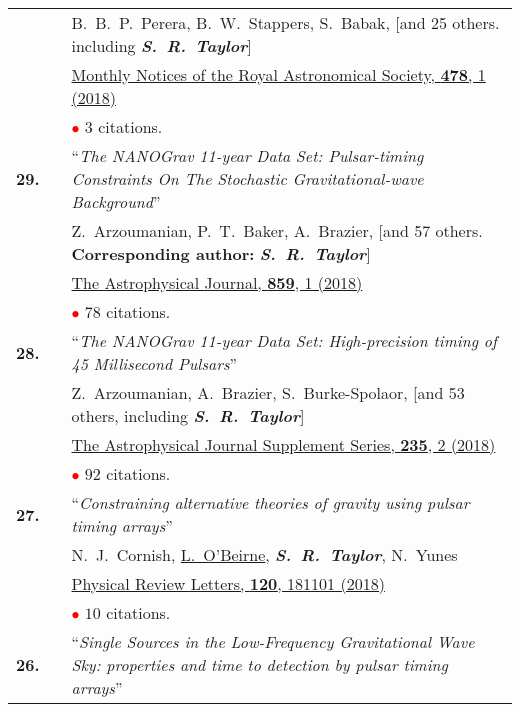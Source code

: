 \documentclass[11pt,letterpaper,sans]{moderncv}
\begin{document}
{\begin{longtable}{rp{0.3cm}p{15.8cm}}
&&B.~B.~P.~Perera, B.~W.~Stappers, S.~Babak, [and 25 others. including \textit{\textbf{S.~R.~Taylor}}]\\
&& \href{https://academic.oup.com/mnras/article-abstract/478/1/218/4990951?redirectedFrom=fulltext}{{\color{color1} Monthly Notices of the Royal Astronomical Society, \textbf{478}, 1 (2018)}}  \\
&& \textcolor{red}{$\bullet$} $3$ citations. \vspace{0.09cm}\\
\textbf{29.} & & ``\textit{The NANOGrav 11-year Data Set: Pulsar-timing Constraints On The Stochastic Gravitational-wave Background}'' \\ 
&&Z.~Arzoumanian, P.~T.~Baker, A.~Brazier, [and 57 others. \textbf{Corresponding author:} \textit{\textbf{S.~R.~Taylor}}]\\
&& \href{http://iopscience.iop.org/article/10.3847/1538-4357/aabd3b/meta}{{\color{color1} The Astrophysical Journal, \textbf{859}, 1 (2018)}}  \\
&& \textcolor{red}{$\bullet$} $78$ citations. \vspace{0.09cm}\\
\textbf{28.} & & ``\textit{The NANOGrav 11-year Data Set: High-precision timing of 45 Millisecond Pulsars}'' \\ 
&&Z.~Arzoumanian, A.~Brazier, S.~Burke-Spolaor, [and 53 others, including \textit{\textbf{S.~R.~Taylor}}]\\
&& \href{http://iopscience.iop.org/article/10.3847/1538-4365/aab5b0/meta}{{\color{color1} The Astrophysical Journal Supplement Series, \textbf{235}, 2 (2018)}}  \\
&& \textcolor{red}{$\bullet$} $92$ citations. \vspace{0.09cm}\\
\textbf{27.} & & ``\textit{Constraining alternative theories of gravity using pulsar timing arrays}'' \\ 
&&N.~J.~Cornish, \underline{L.~O'Beirne}, \textit{\textbf{S.~R.~Taylor}}, N.~Yunes\\
&& \href{https://journals.aps.org/prl/abstract/10.1103/PhysRevLett.120.181101}{{\color{color1} Physical Review Letters, \textbf{120}, 181101 (2018)}}  \\
&& \textcolor{red}{$\bullet$} $10$ citations. \vspace{0.09cm}\\
\textbf{26.} & & ``\textit{Single Sources in the Low-Frequency Gravitational Wave Sky: properties and time to detection by pulsar timing arrays}'' \\ 

\end{longtable}}
\end{document}

